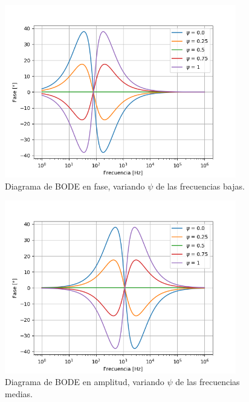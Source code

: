 \documentclass[a4paper]{article}
\begin{document}
\begin{figure}[H]
\centering
	\includegraphics[width=0.9\textwidth]{Imagenes/Low-psi-ph.png}
	\caption{Diagrama de BODE en fase, variando $\psi$ de las frecuencias bajas.}
	\label{fig:bode_ph_low}
\end{figure}

\begin{figure}[H]
\centering
	\includegraphics[width=0.9\textwidth]{Imagenes/Medium-psi-bode.png}
	\caption{Diagrama de BODE en amplitud, variando $\psi$ de las frecuencias medias.}
	\label{fig:bode_modulo_low}
\end{figure}
\end{document}
